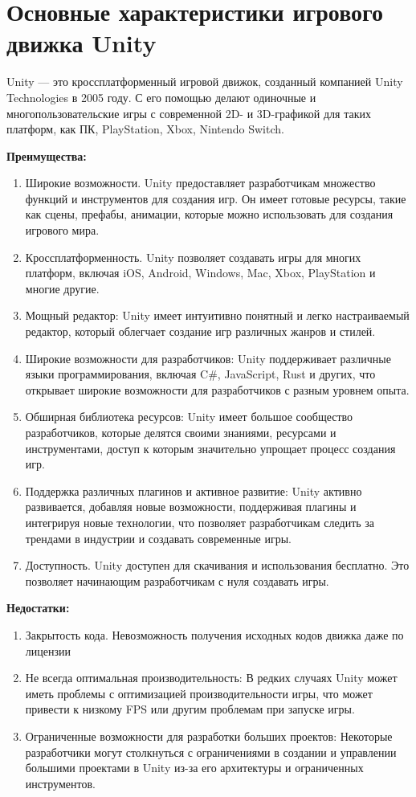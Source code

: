 \section{\label{subsec:ch01/sec01/sub02}Основные характеристики игрового движка Unity}
Unity — это кроссплатформенный игровой движок, созданный компанией Unity Technologies в 2005 году. С его помощью делают одиночные и многопользовательские игры с современной 2D- и 3D-графикой для таких платформ, как ПК, PlayStation, Xbox, Nintendo Switch.


\textbf{Преимущества:}

\begin{enumerate}
    \item Широкие возможности. Unity предоставляет разработчикам множество функций и инструментов для создания игр. Он имеет готовые ресурсы, такие как сцены, префабы, анимации, которые можно использовать для создания игрового мира.
    \item Кроссплатформенность. Unity позволяет создавать игры для многих платформ, включая iOS, Android, Windows, Mac, Xbox, PlayStation и многие другие.
    \item Мощный редактор: Unity имеет интуитивно понятный и легко настраиваемый редактор, который облегчает создание игр различных жанров и стилей.
    \item Широкие возможности для разработчиков: Unity поддерживает различные языки программирования, включая C\#, JavaScript, Rust и других, что открывает широкие возможности для разработчиков с разным уровнем опыта.
    \item Обширная библиотека ресурсов: Unity имеет большое сообщество разработчиков, которые делятся своими знаниями, ресурсами и инструментами, доступ к которым значительно упрощает процесс создания игр.
    \item Поддержка различных плагинов и активное развитие: Unity активно развивается, добавляя новые возможности, поддерживая плагины и интегрируя новые технологии, что позволяет разработчикам следить за трендами в индустрии и создавать современные игры.
    \item Доступность. Unity доступен для скачивания и использования бесплатно. Это позволяет начинающим разработчикам с нуля создавать игры.
\end{enumerate}

\textbf{Недостатки:}

\begin{enumerate}
    \item Закрытость кода. Невозможность получения исходных кодов движка даже по лицензии
    \item Не всегда оптимальная производительность: В редких случаях Unity может иметь проблемы с оптимизацией производительности игры, что может привести к низкому FPS или другим проблемам при запуске игры.
    \item Ограниченные возможности для разработки больших проектов: Некоторые разработчики могут столкнуться с ограничениями в создании и управлении большими 
    проектами в Unity из-за его архитектуры и ограниченных инструментов.
\end{enumerate}

